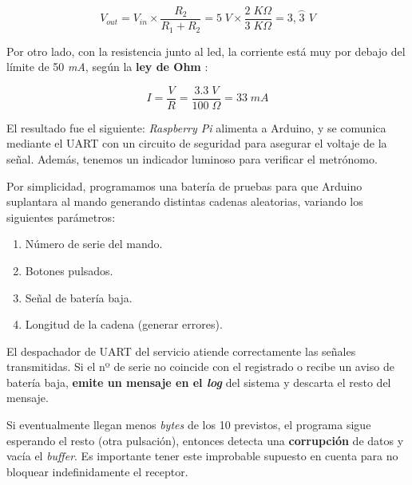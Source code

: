 \begin{equation}
	V_{out} = V_{in} \times \frac{R_2}{R_1 + R_2} = 5 \; V \times \frac{2 \; K\Omega}{3 \; K\Omega} = 3,\stackrel{\frown}{3} \; V
\end{equation}


Por otro lado, con la resistencia junto al \acrshort{led}, la corriente está muy por debajo del límite de 50 \textit{mA}, según la \textbf{ley de Ohm} \cite{wiki_ohm}:

\begin{equation}
	I = \frac{V}{R} = \frac{3.3 \; V}{100 \; \Omega} = 33 \; mA
\end{equation}

El resultado fue el siguiente: \textit{Raspberry Pi} alimenta a Arduino, y se comunica mediante el \acrshort{UART} con un circuito de seguridad para asegurar el voltaje de la señal. Además, tenemos un indicador luminoso para verificar el metrónomo.

Por simplicidad, programamos una batería de pruebas para que Arduino suplantara al mando generando distintas cadenas aleatorias, variando los siguientes parámetros:

\begin{enumerate}
	\item Número de serie del mando.
	\item Botones pulsados.
	\item Señal de batería baja.
	\item Longitud de la cadena (generar errores).
\end{enumerate}

El despachador de \acrshort{UART} del servicio atiende correctamente las señales transmitidas. Si el nº de serie no coincide con el registrado o recibe un aviso de batería baja, \textbf{emite un mensaje en el \textit{log}} del sistema y descarta el resto del mensaje.

Si eventualmente llegan menos \textit{bytes} de los 10 previstos, el programa sigue esperando el resto (otra pulsación), entonces detecta una \textbf{corrupción} de datos y vacía el \textit{buffer}. Es importante tener este improbable supuesto en cuenta para no bloquear indefinidamente el receptor.

\smallskip

